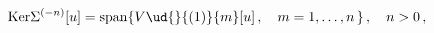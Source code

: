 \begin{equation*}
{\mathrm{Ker}} \Sigma^{(-n)}[u] =
{\mathrm{span}}\{V\ud{}{(1)}{m}[u]\,,\quad {m} = 1,\ldots,{n}\, \}\,,\quad
{n} > 0 \,,
\end{equation*}

